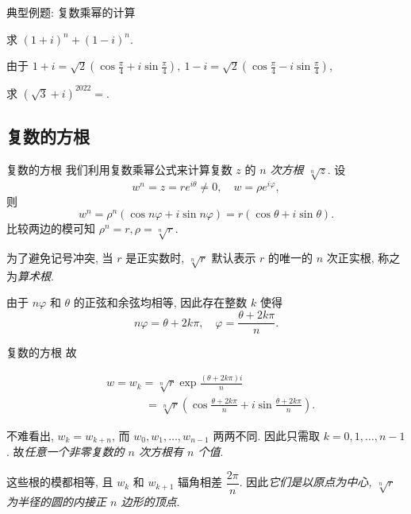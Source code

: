 \begin{frame}{典型例题: 复数乘幂的计算}
	\onslide<+->
	\begin{example}
		求 $(1+i)^n+(1-i)^n$.
	\end{example}

	\onslide<+->
	\begin{solution}
		由于 $1+i=\sqrt2\left(\cos\frac\pi4+i\sin\frac\pi4\right),\ 
		1-i=\sqrt2\left(\cos\frac\pi4-i\sin\frac\pi4\right)$,
	\end{solution}

	\onslide<+->
	\begin{exercise}
		求 $(\sqrt3+i)^{2022}=$.
	\end{exercise}
\end{frame}


\subsection{复数的方根}
\begin{frame}{复数的方根}
	\onslide<+->
	我们利用复数乘幂公式来计算复数 $z$ 的 \emph{$n$ 次方根 $\sqrt[n]z$}.
	\onslide<+->
	设
	\[w^n=z=re^{i\theta}\neq0,\quad w=\rho e^{i\varphi},\]
	\onslide<+->
	则
	\[w^n=\rho^n(\cos{n\varphi}+i\sin{n\varphi})=r(\cos\theta+i\sin\theta).\]
	\onslide<+->
	比较两边的模可知 $\rho^n=r,\rho=\sqrt[n]r$.

	\onslide<+->
	为了避免记号冲突, 当 $r$ 是正实数时, $\sqrt[n]r$ 默认表示 $r$ 的唯一的 $n$ 次正实根, 称之为\emph{算术根}.

	\onslide<+->
	由于 $n\varphi$ 和 $\theta$ 的正弦和余弦均相等, 因此存在整数 $k$ 使得
	\[n\varphi=\theta+2k\pi,\quad \varphi=\frac{\theta+2k\pi}n.\]
\end{frame}


\begin{frame}{复数的方根}
	\onslide<+->
	故
	\begin{alertblock@}
	\begin{align*}
		&w=w_k=\sqrt[n]r\exp\frac{(\theta+2k\pi)i}n\\
		&\hspace{42pt}=\sqrt[n]r\left(\cos\frac{\theta+2k\pi}n+i\sin\frac{\theta+2k\pi}n\right).
	\end{align*}
	\end{alertblock@}

	\onslide<+->
	不难看出, $w_k=w_{k+n}$, 而 $w_0,w_1,\dots,w_{n-1}$ 两两不同.
	\onslide<+->
	因此只需取 \alert{$k=0,1,\dots,n-1$}.
	\onslide<+->
	故\emph{任意一个非零复数的 $n$ 次方根有 $n$ 个值}.

	\onslide<+->
	这些根的模都相等, 且 $w_k$ 和 $w_{k+1}$ 辐角相差 $\dfrac{2\pi}n$.
	\onslide<+->
	因此\emph{它们是以原点为中心, $\sqrt[n]r$ 为半径的圆的内接正 $n$ 边形的顶点}.
\end{frame}


